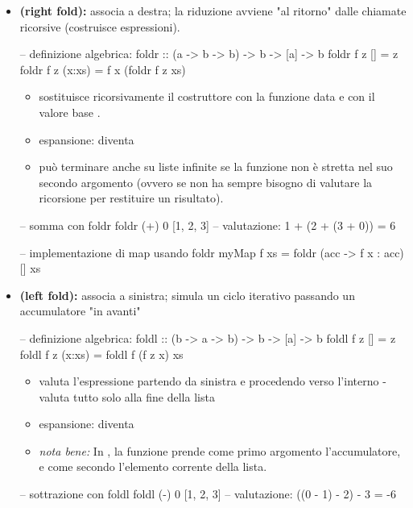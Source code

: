 \begin{itemize}
    \item \textbf{ (right fold):} associa a destra; la riduzione avviene "al ritorno" dalle chiamate ricorsive (costruisce espressioni). 
        \begin{haskellbox}{}
-- definizione algebrica:
foldr :: (a -> b -> b) -> b -> [a] -> b
foldr f z []     = z
foldr f z (x:xs) = f x (foldr f z xs)
        \end{haskellbox}

\begin{itemize}
    \item sostituisce ricorsivamente il costruttore \code{(:)} con la funzione  data e \code{[]} con il valore base .
        \item espansione:  diventa 
        \item può terminare anche su liste infinite se la funzione  non è stretta nel suo secondo argomento (ovvero se non ha sempre bisogno di valutare la ricorsione per restituire un risultato).
\end{itemize}
        \begin{haskellbox}{}
-- somma con foldr
foldr (+) 0 [1, 2, 3]
-- valutazione: 1 + (2 + (3 + 0)) = 6

-- implementazione di map usando foldr
myMap f xs = foldr (\x acc -> f x : acc) [] xs

\end{haskellbox}

    \item \textbf{ (left fold):} associa a sinistra; simula un ciclo iterativo passando un accumulatore "in avanti"
        \begin{haskellbox}{}
-- definizione algebrica:
foldl :: (b -> a -> b) -> b -> [a] -> b
foldl f z []     = z
foldl f z (x:xs) = foldl f (f z x) xs
        \end{haskellbox}
\begin{itemize}
    \item valuta l'espressione partendo da sinistra e procedendo verso l'interno - valuta tutto solo alla fine della lista
        \item espansione:  diventa 
        \item \textit{nota bene:} In , la funzione prende come primo argomento l'accumulatore, e come secondo l'elemento corrente della lista.
\end{itemize}
        \begin{haskellbox}{}
-- sottrazione con foldl
foldl (-) 0 [1, 2, 3]
-- valutazione: ((0 - 1) - 2) - 3 = -6


\end{haskellbox}
\end{itemize}
